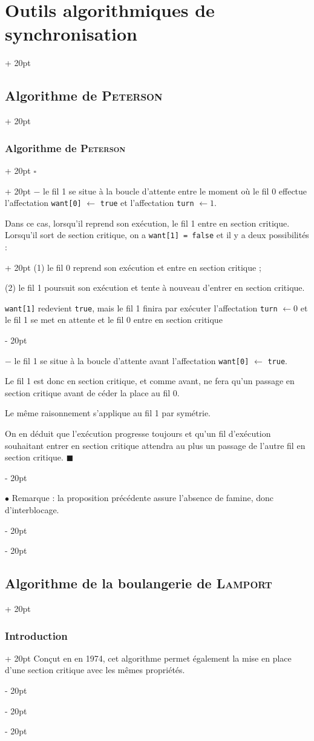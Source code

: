 \documentclass[a4paper, 12pt, twoside]{article}
\newcommand{\ind}[1][20pt]{\advance\leftskip + #1}
\newcommand{\deind}[1][20pt]{\advance\leftskip - #1}
\newenvironment{indt}[2][20pt]{#2 \par \ind[#1]}{\par \deind} %
\newenvironment{proof}[1][{}]{\begin{indt}{$\square$ #1}}{$\blacksquare$ \end{indt}}
\begin{document}
\begin{indt}{\section{Outils algorithmiques de synchronisation}}
\begin{indt}{\subsection{Algorithme de \textsc{Peterson}}}
\begin{indt}{\subsubsection{Algorithme de \textsc{Peterson}}}
\begin{proof}
                    $-$ le fil 1 se situe à la boucle d'attente entre le moment où le fil 0 effectue l'affectation \texttt{want[0]} $\leftarrow$ \texttt{true} et l'affectation \texttt{turn} $\leftarrow 1$.

                    Dans ce cas, lorsqu'il reprend son exécution, le fil 1 entre en section critique.
                    \begin{indt}{Lorsqu'il sort de section critique, on a \texttt{want[1] = false} et il y a deux possibilités :}
                        (1) le fil 0 reprend son exécution et entre en section critique ;

                        (2) le fil 1 poursuit son exécution et tente à nouveau d'entrer en section critique.

                        \texttt{want[1]} redevient \texttt{true}, mais le fil 1 finira par exécuter l'affectation \texttt{turn} $\leftarrow 0$ et le fil 1 se met en attente et le fil 0 entre en section critique
                    \end{indt}

                    $-$ le fil 1 se situe à la boucle d'attente avant l'affectation \texttt{want[0]} $\leftarrow$ \texttt{true}.

                    Le fil 1 est donc en section critique, et comme avant, ne fera qu'un passage en section critique avant de céder la place au fil 0.

                    Le même raisonnement s'applique au fil 1 par symétrie.

                    On en déduit que l'exécution progresse toujours et qu'un fil d'exécution souhaitant entrer en section critique attendra au plus un passage de l'autre fil en section critique.
                \end{proof}

                \vspace{12pt}
                
                $\bullet$ Remarque : la proposition précédente assure l'absence de famine, donc d'interblocage.
            \end{indt}
        \end{indt}

        \vspace{12pt}
        
        \begin{indt}{\subsection{Algorithme de la boulangerie de \textsc{Lamport}}}
            \begin{indt}{\subsubsection{Introduction}}
                Conçut en en 1974, cet algorithme permet également la mise en place d'une section critique avec les mêmes propriétés.


\end{indt}
\end{indt}
\end{indt}
\end{document}
